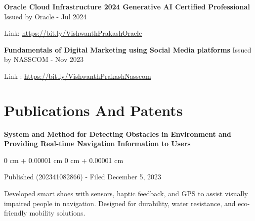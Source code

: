\documentclass[10pt, letterpaper]{article}
\newenvironment{onecolentry}{
    \begin{adjustwidth}{
        0 cm + 0.00001 cm
    }{
        0 cm + 0.00001 cm
    }
}{
    \end{adjustwidth}
} %
\begin{document}
\vspace{0.2 cm}

 \begin{samepage}
    \noindent
    \textbf{Oracle Cloud Infrastructure 2024 Generative AI Certified Professional  } 
    \hfill 
    Issued by Oracle - Jul 2024 
    
    \vspace{0.03 cm}
    
    \noindent
   Link: \href{https://bit.ly/VishwanthPrakashOracle }{https://bit.ly/VishwanthPrakashOracle }
\end{samepage}

\vspace{0.2 cm}

 \begin{samepage}
    \noindent
   \textbf{Fundamentals of Digital Marketing using Social Media platforms} 
    \hfill 
    Issued by NASSCOM - Nov 2023\textbf{ }
    
    \vspace{0.03 cm}
    
    \noindent
   Link : \href{https://bit.ly/VishwanthPrakashNasscom }{https://bit.ly/VishwanthPrakashNasscom }
\end{samepage}
    
    \section{Publications And Patents}
       
        \begin{samepage}
     \textbf{System and Method for Detecting Obstacles in Environment and Providing Real-time Navigation Information to Users}
      \vspace{0.05 cm}
      
      \begin{onecolentry}
               Published (202341082866) - Filed December 5, 2023 
               
               \vspace{0.05 cm}
               
               Developed smart shoes with sensors, haptic feedback, and GPS to assist visually impaired people in navigation. Designed for durability, water resistance, and eco-friendly mobility solutions.  
        \end{onecolentry}
        \end{samepage}

         \vspace{0.3 cm}
\end{document}
